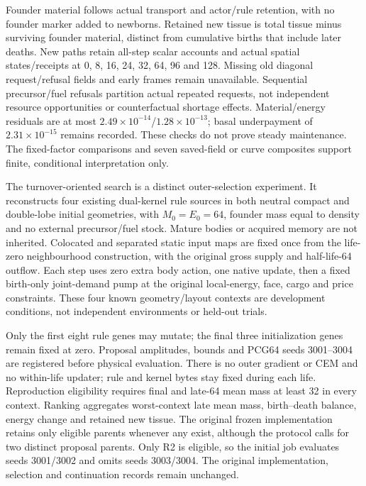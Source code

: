 Founder material follows actual transport and actor/rule retention, with no founder marker added to newborns. Retained new tissue is total tissue minus surviving founder material, distinct from cumulative births that include later deaths. New paths retain all-step scalar accounts and actual spatial states/receipts at 0, 8, 16, 24, 32, 64, 96 and 128. Missing old diagonal request/refusal fields and early frames remain unavailable. Sequential precursor/fuel refusals partition actual repeated requests, not independent resource opportunities or counterfactual shortage effects. Material/energy residuals are at most $2.49\times10^{-14}$/$1.28\times10^{-13}$; basal underpayment of $2.31\times10^{-15}$ remains recorded. These checks do not prove steady maintenance. The fixed-factor comparisons and seven saved-field or curve composites support finite, conditional interpretation only.

The turnover-oriented search is a distinct outer-selection experiment. It reconstructs four existing dual-kernel rule sources in both neutral compact and double-lobe initial geometries, with $M_0=E_0=64$, founder mass equal to density and no external precursor/fuel stock. Mature bodies or acquired memory are not inherited. Colocated and separated static input maps are fixed once from the life-zero neighbourhood construction, with the original gross supply and half-life-64 outflow. Each step uses zero extra body action, one native update, then a fixed birth-only joint-demand pump at the original local-energy, face, cargo and price constraints. These four known geometry/layout contexts are development conditions, not independent environments or held-out trials.

Only the first eight rule genes may mutate; the final three initialization genes remain fixed at zero. Proposal amplitudes, bounds and PCG64 seeds 3001--3004 are registered before physical evaluation. There is no outer gradient or CEM and no within-life updater; rule and kernel bytes stay fixed during each life. Reproduction eligibility requires final and late-64 mean mass at least 32 in every context. Ranking aggregates worst-context late mean mass, birth--death balance, energy change and retained new tissue. The original frozen implementation retains only eligible parents whenever any exist, although the protocol calls for two distinct proposal parents. Only R2 is eligible, so the initial job evaluates seeds 3001/3002 and omits seeds 3003/3004. The original implementation, selection and continuation records remain unchanged.

